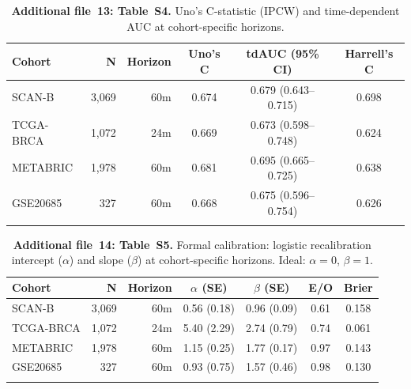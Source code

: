 \documentclass[pdflatex,sn-vancouver-num]{sn-jnl}
\begin{document}
\begin{table}[!ht]
\caption{\textbf{Additional file~13: Table~S4.} Uno's C-statistic (IPCW) and time-dependent AUC at cohort-specific horizons.}\label{tab:s4-unoc}
\begin{tabular}{@{}lrrccc@{}}
\toprule
Cohort & N & Horizon & Uno's C & tdAUC (95\% CI) & Harrell's C \\
\midrule
SCAN-B & 3,069 & 60m & 0.674 & 0.679 (0.643--0.715) & 0.698 \\
TCGA-BRCA & 1,072 & 24m & 0.669 & 0.673 (0.598--0.748) & 0.624 \\
METABRIC & 1,978 & 60m & 0.681 & 0.695 (0.665--0.725) & 0.638 \\
GSE20685 & 327 & 60m & 0.668 & 0.675 (0.596--0.754) & 0.626 \\
\botrule
\end{tabular}
\end{table}

\begin{table}[!ht]
\caption{\textbf{Additional file~14: Table~S5.} Formal calibration: logistic recalibration intercept ($\alpha$) and slope ($\beta$) at cohort-specific horizons. Ideal: $\alpha = 0$, $\beta = 1$.}\label{tab:s5-calibration}
\begin{tabular}{@{}lrrcccc@{}}
\toprule
Cohort & N & Horizon & $\alpha$ (SE) & $\beta$ (SE) & E/O & Brier \\
\midrule
SCAN-B & 3,069 & 60m & 0.56 (0.18) & 0.96 (0.09) & 0.61 & 0.158 \\
TCGA-BRCA & 1,072 & 24m & 5.40 (2.29) & 2.74 (0.79) & 0.74 & 0.061 \\
METABRIC & 1,978 & 60m & 1.15 (0.25) & 1.77 (0.17) & 0.97 & 0.143 \\
GSE20685 & 327 & 60m & 0.93 (0.75) & 1.57 (0.46) & 0.98 & 0.130 \\
\botrule
\end{tabular}
\end{table}
\end{document}
